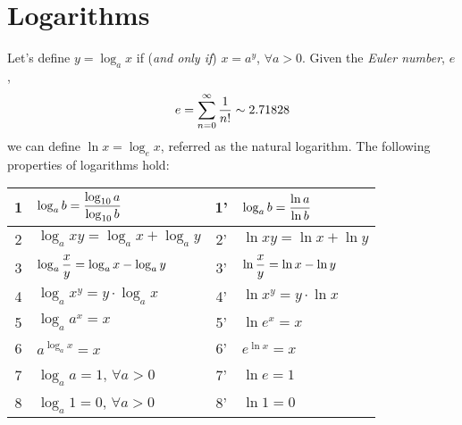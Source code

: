 \section{Logarithms}
Let's define $y = \log_{a}x$ if ({\it and only if}) $x=a^{y}$, $\forall a>0$. Given the {\it Euler number}, $e$,
\begin{displaymath}
e = \sum\limits_{n=0}^{\infty}\displaystyle\frac{1}{n!}\sim 2.71828
\end{displaymath}
we can define $\ln x = \log_{e}{x}$, referred as the natural logarithm. The following properties of logarithms hold:
\begin{center}
  \begin{tabular}{||c l | c l||}
     \hline\hline
       1  & $\log_{a}b = \displaystyle\frac{\log_{10}{a}}{\log_{10}{b}}$ & 1' & $\log_{a}b = \displaystyle\frac{\ln{a}}{\ln{b}}$\\
     \hline
       2  & $\log_{a}{xy} = \log_{a}{x}+\log_{a}{y}$ & 2' &$\ln{xy} = \ln{x}+\ln{y}$  \\
     \hline
       3  & $\log_{a}{\displaystyle\frac{x}{y}} = \log_{a}{x}-\log_{a}{y}$ & 3' & $\ln{\displaystyle\frac{x}{y}} = \ln{x}-\ln{y}$ \\
     \hline
       4  & $\log_{a}{x^{y}} = y\cdot\log_{a}{x}$ & 4' & $\ln{x^{y}} = y\cdot\ln{x}$ \\
     \hline
       5  & $\log_{a}{a^{x}} = x$ & 5' & $\ln{e^{x}} = x$ \\
     \hline
       6  & $a^{\log_{a}{x}} = x$   & 6' & $e^{\ln{x}} = x$ \\
     \hline
       7  & $\log_{a}{a} = 1$, $\forall a>0$ & 7' & $\ln{e} = 1$ \\ 
     \hline
       8  & $\log_{a}1 = 0$, $\forall a > 0$ & 8' & $\ln{1} = 0$ \\
     \hline\hline
  \end{tabular}  
\end{center}
